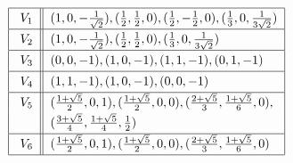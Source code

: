 \documentclass[12pt]{article}
\theoremstyle{definition}\newtheorem{definition}{Definition}[section]
\begin{document}
\begin{table}
$$\begin{array}{cc}
{\begin{tabular}{|c||l|}
 \hline
 \rule{0pt}{2.5ex} $V_1$ & $(1,0,-\frac{1}{\sqrt{2}}),(\frac{1}{2},\frac{1}{2},0),(\frac{1}{2},-\frac{1}{2},0),(\frac{1}{3},0,\frac{1}{3\sqrt{2}})$ \\ [0.5ex]
 \hline
 \rule{0pt}{2.5ex} $V_2$ & $(1,0,-\frac{1}{\sqrt{2}}),(\frac{1}{2},\frac{1}{2},0),(\frac{1}{3},0,\frac{1}{3\sqrt{2}})$ \\ [0.5ex]
 \hline
 \rule{0pt}{2.5ex} $V_3$ & $(0,0,-1),(1,0,-1),(1,1,-1),(0,1,-1)$ \\ [0.5ex]
 \hline
 \rule{0pt}{2.5ex} $V_4$ & $(1,1,-1), (1,0,-1), (0,0,-1)$ \\ [0.5ex]
 \hline
 \rule{0pt}{2.5ex} $V_5$ & $(\frac{1+\sqrt{5}}{2},0,1),(\frac{1+\sqrt{5}}{2},0,0),(\frac{2+\sqrt{5}}{3},\frac{1+\sqrt{5}}{6},0)$,\\[.5ex] 
 &$(\frac{3+\sqrt{5}}{4},\frac{1+\sqrt{5}}{4},\frac{1}{2})$ \\ [0.5ex]
 \hline
 \rule{0pt}{2.5ex} $V_6$ & $(\frac{1+\sqrt{5}}{2},0,1), (\frac{1+\sqrt{5}}{2},0,0), (\frac{2+\sqrt{5}}{3},\frac{1+\sqrt{5}}{6},0)$ \\ [0.5ex]
 \hline
\end{tabular}}
\end{array}$$
\caption{Fundamental regions for $G^{+}(P)$ for the finite regular polyhedra $P$.}
\label{gplusfunregfinite}
\end{table}
%
%
\end{document}
